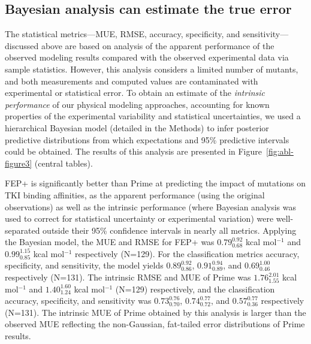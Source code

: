 \documentclass[phd,tocprelim]{cornell}
\begin{document}
\subsection{Bayesian analysis can estimate the true error}
The statistical metrics---MUE, RMSE, accuracy, specificity, and sensitivity---discussed above are based on analysis of the apparent performance of the observed modeling results compared with the observed experimental data via sample statistics.
However, this analysis considers a limited number of mutants, and both measurements and computed values are contaminated with experimental or statistical error. 
To obtain an estimate of the \emph{intrinsic performance} of our physical modeling approaches, accounting for known properties of the experimental variability and statistical uncertainties, we used a hierarchical Bayesian model (detailed in the Methods) to infer posterior predictive distributions from which expectations and 95\% predictive intervals could be obtained.
The results of this analysis are presented in Figure~\ref{fig:abl-figure3} (central tables). 

FEP+ is significantly better than Prime at predicting the impact of mutations on TKI binding affinities, as the apparent performance (using the original observations) as well as the intrinsic performance (where Bayesian analysis was used to correct for statistical uncertainty or experimental variation) were well-separated outside their 95\% confidence intervals in nearly all metrics.
Applying the Bayesian model, the MUE and RMSE for FEP+ was $0.79^{0.92}_{0.68}$ kcal mol$^{-1}$ and $0.99^{1.15}_{0.85}$ kcal mol$^{-1}$ respectively (N=129). 
For the classification metrics accuracy, specificity, and sensitivity, the model yields $0.89^{0.92}_{0.86}$, $0.91^{0.94}_{0.89}$, and $0.69^{1.00}_{0.46}$ respectively (N=131).
The intrinsic RMSE and MUE of Prime was $1.76^{2.01}_{1.55}$ kcal mol$^{-1}$ and $1.40^{1.60}_{1.24}$ kcal mol$^{-1}$ (N=129) respectively, and the classification accuracy, specificity, and sensitivity was $0.73^{0.76}_{0.70}$, $0.74^{0.77}_{0.72}$, and $0.57^{0.77}_{0.36}$ respectively (N=131).
The intrinsic MUE of Prime obtained by this analysis is larger than the observed MUE reflecting the non-Gaussian, fat-tailed error distributions of Prime results.
\end{document}
